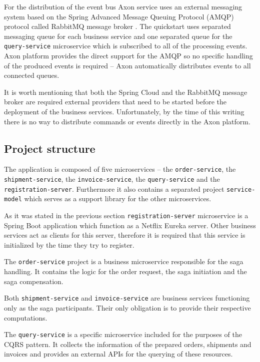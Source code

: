 \documentclass[oneside,
  digital, %
  table,   %
  nolof,     %
  nolot,     %
]{fithesis3}
\begin{document}
For the distribution of the event bus Axon service uses an external messaging system based on the Spring Advanced Message Queuing Protocol (AMQP) protocol called RabbitMQ message broker \cite{rabbitmq}. The quickstart uses separated messaging queue for each business service and one separated queue for the \texttt{query-service} microservice which is subscribed to all of the processing events. Axon platform provides the direct support for the AMQP so no specific handling of the produced events is required -- Axon automatically distributes events to all connected queues.

It is worth mentioning that both the Spring Cloud and the RabbitMQ message broker are required external providers that need to be started before the deployment of the business services. Unfortunately, by the time of this writing there is no way to distribute commands or events directly in the Axon platform.

\subsection{Project structure}

The application is composed of five microservices -- the  \texttt{order-service}, the \texttt{shipment-service}, the \texttt{invoice-service}, the \texttt{query-service} and the \texttt{registration-server}. Furthermore it also contains a separated project \texttt{service-model} which serves as a support library for the other microservices.

As it was stated in the previous section \texttt{registration-server} microservice is a Spring Boot application which function as a Netflix Eureka server. Other business services act as clients for this server, therefore it is required that this service is initialized by the time they try to register.

The \texttt{order-service} project is a business microservice responsible for the saga handling. It contains the logic for the order request, the saga initiation and the saga compensation.

Both \texttt{shipment-service} and \texttt{invoice-service} are business services functioning only as the saga participants. Their only obligation is to provide their respective computations.

The \texttt{query-service} is a specific microservice included for the purposes of the CQRS pattern. It collects the information of the prepared orders, shipments and invoices and provides an external APIs for the querying of these resources. 
\end{document}
